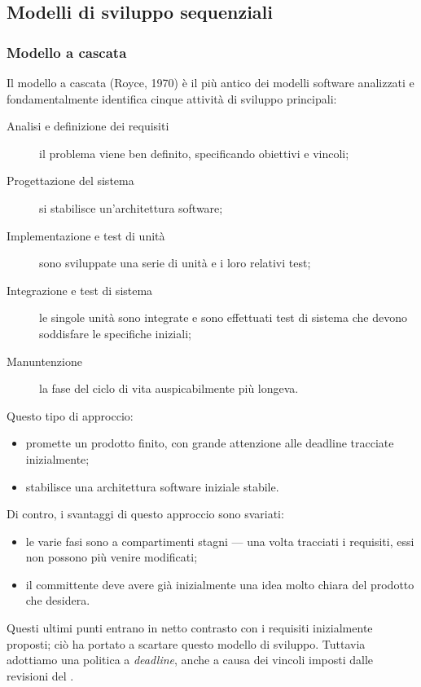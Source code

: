 \subsection{Modelli di sviluppo sequenziali}

\subsubsection{Modello a cascata}
Il modello a cascata (Royce, 1970) è il più antico dei modelli software analizzati e fondamentalmente identifica cinque attività di sviluppo principali:
\begin{description}
	\item [Analisi e definizione dei requisiti] il problema viene ben definito, specificando obiettivi e vincoli;
	\item [Progettazione del sistema] si stabilisce un'architettura software;
	\item [Implementazione e test di unità] sono sviluppate una serie di unità e i loro relativi test;
	\item [Integrazione e test di sistema] le singole unità sono integrate e sono effettuati test di sistema che devono soddisfare le specifiche iniziali;
	\item [Manuntenzione] la fase del ciclo di vita auspicabilmente più longeva.
\end{description}

Questo tipo di approccio:
\begin{itemize}
	\item promette un prodotto finito, con grande attenzione alle deadline tracciate inizialmente;
	\item stabilisce una architettura software iniziale stabile.
\end{itemize}

Di contro, i svantaggi di questo approccio sono svariati:
\begin{itemize}
	\item le varie fasi sono a compartimenti stagni --- una volta tracciati i requisiti, essi non possono più venire modificati;
	\item il committente deve avere già inizialmente una idea molto chiara del prodotto che desidera.
\end{itemize}
Questi ultimi punti entrano in netto contrasto con i requisiti inizialmente proposti; ciò ha portato a scartare questo modello di sviluppo. Tuttavia adottiamo una politica a \emph{deadline}, anche a causa dei vincoli imposti dalle revisioni del \TV.

